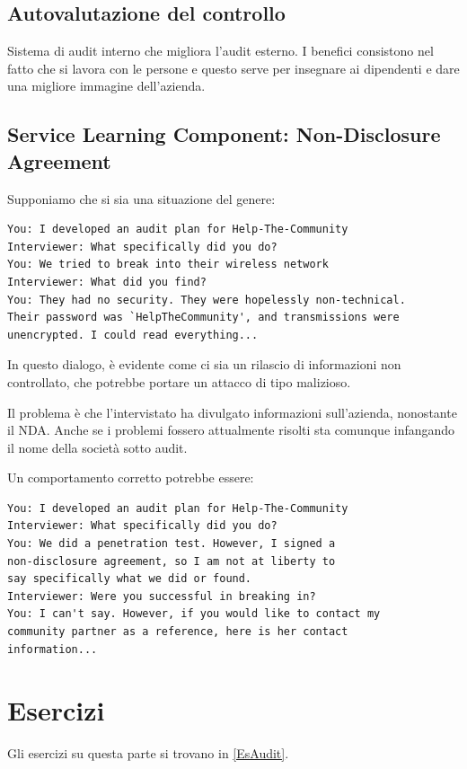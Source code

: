 \subsection{Autovalutazione del controllo}

Sistema di audit interno che migliora l'audit esterno. I benefici consistono
nel fatto che si lavora con le persone e questo serve per insegnare ai
dipendenti e dare una migliore immagine dell'azienda.


\subsection{Service Learning Component: Non-Disclosure Agreement}

Supponiamo che si sia una situazione del genere:

\begin{verbatim}
You: I developed an audit plan for Help-The-Community
Interviewer: What specifically did you do?
You: We tried to break into their wireless network
Interviewer: What did you find?
You: They had no security. They were hopelessly non-technical.
Their password was `HelpTheCommunity', and transmissions were
unencrypted. I could read everything...
\end{verbatim}

In questo dialogo, è evidente come ci sia un rilascio di informazioni non
controllato, che potrebbe portare un attacco di tipo malizioso.

Il problema è che l'intervistato ha divulgato informazioni sull'azienda,
nonostante il NDA. Anche se i problemi fossero attualmente risolti sta comunque
infangando il nome della società sotto audit.


Un comportamento corretto potrebbe essere:
\begin{verbatim}
You: I developed an audit plan for Help-The-Community
Interviewer: What specifically did you do?
You: We did a penetration test. However, I signed a
non-disclosure agreement, so I am not at liberty to
say specifically what we did or found.
Interviewer: Were you successful in breaking in?
You: I can't say. However, if you would like to contact my
community partner as a reference, here is her contact
information...
\end{verbatim}

\section{Esercizi}
Gli esercizi su questa parte si trovano in \ref{EsAudit}.

